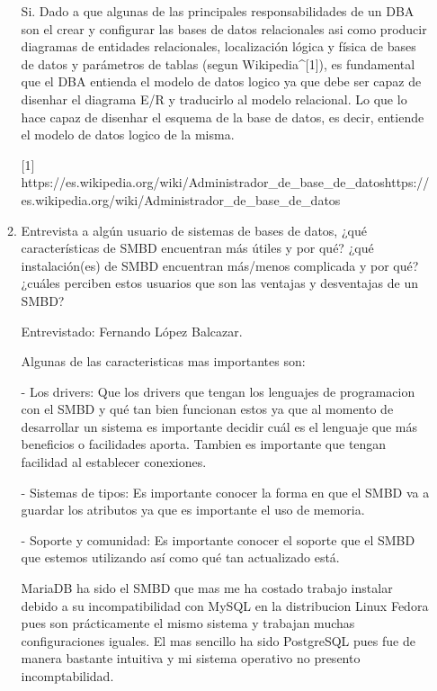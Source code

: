 \documentclass[12pt,a4paper]{article}
\begin{document}
\begin{enumerate}
\begin{enumerate}
				Si. Dado a que algunas de las principales responsabilidades de un DBA son el crear y configurar las bases de datos 
				relacionales asi como producir diagramas de entidades relacionales, localización lógica y física de bases de datos y 
				parámetros de tablas (segun Wikipedia^[1]), es fundamental que el DBA entienda el modelo de datos logico ya que debe ser
				capaz de disenhar el diagrama E/R y traducirlo al modelo relacional. Lo que lo hace capaz de disenhar el esquema de la 
				base de datos, es decir, entiende el modelo de datos logico de la misma.

				[1] https://es.wikipedia.org/wiki/Administrador_de_base_de_datoshttps://es.wikipedia.org/wiki/Administrador_de_base_de_datos
	
				
			\item Entrevista a algún usuario de sistemas de bases de datos, ¿qué características de SMBD encuentran
				más útiles y por qué? ¿qué instalación(es) de SMBD encuentran más/menos complicada y por qué?
				¿cuáles perciben estos usuarios que son las ventajas y desventajas de un SMBD?
				
			      Entrevistado: Fernando López Balcazar.	
				
			      Algunas de las caracteristicas mas importantes son:
                              
			      - Los drivers:
                              Que los drivers que tengan los lenguajes de programacion con el SMBD y qué tan bien funcionan estos ya que al momento de          		       desarrollar un sistema es importante decidir cuál es el lenguaje que más beneficios o facilidades aporta. Tambien es 				      importante que tengan facilidad al establecer conexiones.

			      - Sistemas de tipos:	
			      Es importante conocer la forma en que el SMBD va a guardar los atributos ya que es importante el uso de memoria.

			      - Soporte y comunidad:
			      Es importante conocer el soporte que el SMBD que estemos utilizando así como qué tan actualizado está.

		              MariaDB ha sido el SMBD que mas me ha costado trabajo instalar debido a su incompatibilidad con MySQL en la distribucion 				      Linux Fedora pues son prácticamente el mismo sistema y trabajan muchas configuraciones iguales. El mas sencillo ha sido 				      PostgreSQL pues fue de manera bastante intuitiva y mi sistema operativo no presento incomptabilidad.


\end{enumerate}
\end{enumerate}
\end{document}
